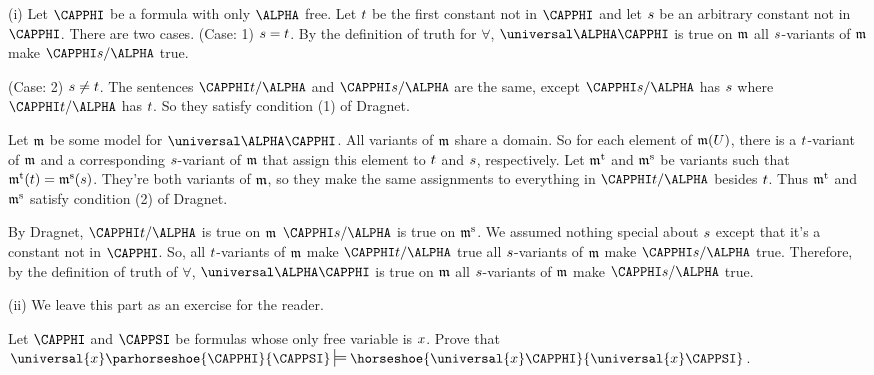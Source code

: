 \begin{PROOF}
(i) Let $\CAPPHI$ be a formula with only $\ALPHA$ free.
Let $t$ be the first constant not in $\CAPPHI$ and let $s$ be an arbitrary constant not in $\CAPPHI$.
There are two cases.
(Case: 1) $s=t$. By the definition of truth for $\forall$, $\universal\ALPHA\CAPPHI$ is true on $\mathfrak{m}$ \Iff all $s$-variants of $\mathfrak{m}$ make $\CAPPHI\variable{s}/\ALPHA$ true.

(Case: 2) $s\not=t$.
The sentences $\CAPPHI\variable{t}/\ALPHA$ and $\CAPPHI\variable{s}/\ALPHA$ are the same, except $\CAPPHI\variable{s}/\ALPHA$ has $s$ where $\CAPPHI\variable{t}/\ALPHA$ has $t$.
So they satisfy condition (1) of Dragnet.

Let $\mathfrak{m}$ be some model for $\universal\ALPHA\CAPPHI$.
All variants of $\mathfrak{m}$ share a domain.
So for each element of $\mathfrak{m}(U)$, there is a $t$-variant of $\mathfrak{m}$ and a corresponding $s$-variant of $\mathfrak{m}$ that assign this element to $t$ and $s$, respectively.
Let $\mathfrak{m^{\mathrm{t}}_{\mathrm{}}}$ and $\mathfrak{m^{\mathrm{s}}_{\mathrm{}}}$ be variants such that $\mathfrak{m^{\mathrm{t}}_{\mathrm{}}}(t)=\mathfrak{m^{\mathrm{s}}_{\mathrm{}}}(s)$.
They're both variants of $\mathfrak{m}$, so they make the same assignments to everything in $\CAPPHI\variable{t}/\ALPHA$ besides $t$.
Thus $\mathfrak{m^{\mathrm{t}}_{\mathrm{}}}$ and $\mathfrak{m^{\mathrm{s}}_{\mathrm{}}}$ satisfy condition (2) of Dragnet.

By Dragnet,	$\CAPPHI\variable{t}/\ALPHA$ is true on $\mathfrak{m}$ \Iff $\CAPPHI\variable{s}/\ALPHA$ is true on $\mathfrak{m^{\mathrm{s}}_{\mathrm{}}}$.
We assumed nothing special about $s$ except that it's a constant not in $\CAPPHI$.
So, all $t$-variants of $\mathfrak{m}$ make $\CAPPHI\variable{t}/\ALPHA$ true \Iff all $s$-variants of $\mathfrak{m}$ make $\CAPPHI\variable{s}/\ALPHA$ true.
Therefore, by the definition of truth of $\forall$, $\universal\ALPHA\CAPPHI$ is true on $\mathfrak{m}$ \Iff all $s$-variants of $\mathfrak{m}$ make $\CAPPHI\variable{s}/\ALPHA$ true.

(ii) We leave this part as an exercise for the reader.
\end{PROOF}

\begin{majorILnc}{}
	Let $\CAPPHI$ and $\CAPPSI$ be formulas whose only free variable is $x$.  Prove that $\universal{\variable{x}}\parhorseshoe{\CAPPHI}{\CAPPSI}\sdtstile{}{}\horseshoe{\universal{\variable{x}}\CAPPHI}{\universal{\variable{x}}\CAPPSI}$.  
\end{majorILnc} 
 

